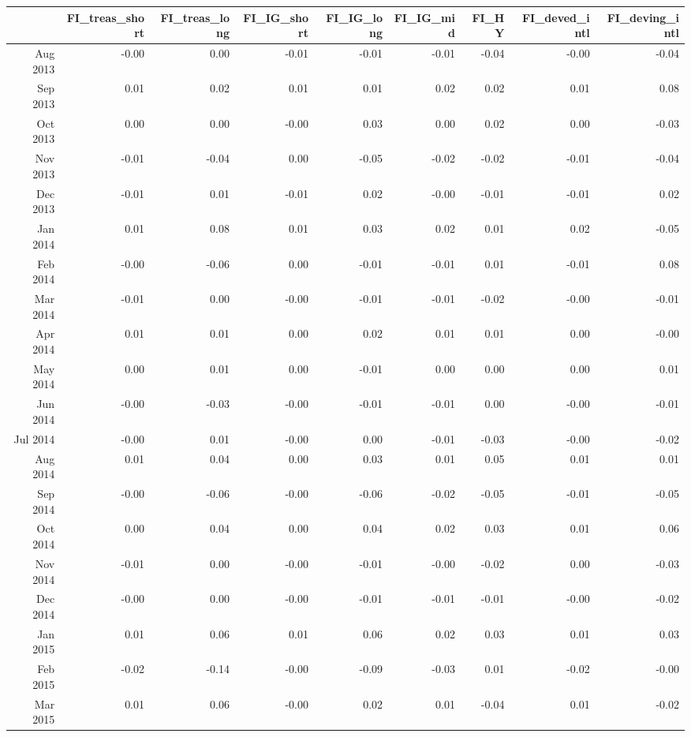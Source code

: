 \begin{tabularx}{\textwidth}{rrrrrrrrr}
  \hline
 & FI\_treas\_short & FI\_treas\_long & FI\_IG\_short & FI\_IG\_long & FI\_IG\_mid & FI\_HY & FI\_deved\_intl & FI\_deving\_intl \\ 
  \hline
Aug 2013 & -0.00 & 0.00 & -0.01 & -0.01 & -0.01 & -0.04 & -0.00 & -0.04 \\ 
  Sep 2013 & 0.01 & 0.02 & 0.01 & 0.01 & 0.02 & 0.02 & 0.01 & 0.08 \\ 
  Oct 2013 & 0.00 & 0.00 & -0.00 & 0.03 & 0.00 & 0.02 & 0.00 & -0.03 \\ 
  Nov 2013 & -0.01 & -0.04 & 0.00 & -0.05 & -0.02 & -0.02 & -0.01 & -0.04 \\ 
  Dec 2013 & -0.01 & 0.01 & -0.01 & 0.02 & -0.00 & -0.01 & -0.01 & 0.02 \\ 
  Jan 2014 & 0.01 & 0.08 & 0.01 & 0.03 & 0.02 & 0.01 & 0.02 & -0.05 \\ 
  Feb 2014 & -0.00 & -0.06 & 0.00 & -0.01 & -0.01 & 0.01 & -0.01 & 0.08 \\ 
  Mar 2014 & -0.01 & 0.00 & -0.00 & -0.01 & -0.01 & -0.02 & -0.00 & -0.01 \\ 
  Apr 2014 & 0.01 & 0.01 & 0.00 & 0.02 & 0.01 & 0.01 & 0.00 & -0.00 \\ 
  May 2014 & 0.00 & 0.01 & 0.00 & -0.01 & 0.00 & 0.00 & 0.00 & 0.01 \\ 
  Jun 2014 & -0.00 & -0.03 & -0.00 & -0.01 & -0.01 & 0.00 & -0.00 & -0.01 \\ 
  Jul 2014 & -0.00 & 0.01 & -0.00 & 0.00 & -0.01 & -0.03 & -0.00 & -0.02 \\ 
  Aug 2014 & 0.01 & 0.04 & 0.00 & 0.03 & 0.01 & 0.05 & 0.01 & 0.01 \\ 
  Sep 2014 & -0.00 & -0.06 & -0.00 & -0.06 & -0.02 & -0.05 & -0.01 & -0.05 \\ 
  Oct 2014 & 0.00 & 0.04 & 0.00 & 0.04 & 0.02 & 0.03 & 0.01 & 0.06 \\ 
  Nov 2014 & -0.01 & 0.00 & -0.00 & -0.01 & -0.00 & -0.02 & 0.00 & -0.03 \\ 
  Dec 2014 & -0.00 & 0.00 & -0.00 & -0.01 & -0.01 & -0.01 & -0.00 & -0.02 \\ 
  Jan 2015 & 0.01 & 0.06 & 0.01 & 0.06 & 0.02 & 0.03 & 0.01 & 0.03 \\ 
  Feb 2015 & -0.02 & -0.14 & -0.00 & -0.09 & -0.03 & 0.01 & -0.02 & -0.00 \\ 
  Mar 2015 & 0.01 & 0.06 & -0.00 & 0.02 & 0.01 & -0.04 & 0.01 & -0.02 \\ 

\end{tabularx}
